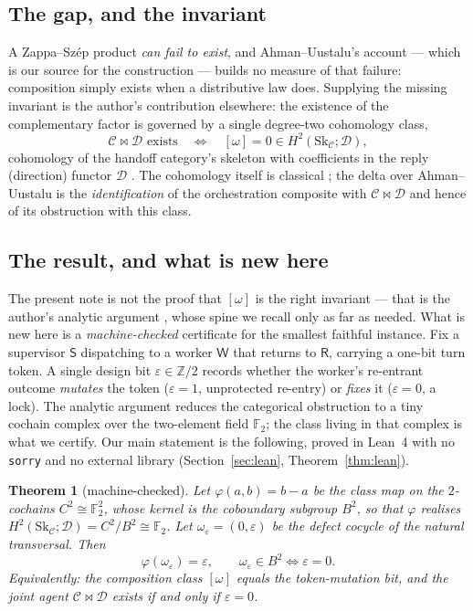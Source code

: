 \documentclass[11pt]{amsart}
\newtheorem{theorem}{Theorem}[section]
\theoremstyle{definition}
\theoremstyle{remark}
\newcommand{\C}{\mathcal{C}}
\newcommand{\D}{\mathcal{D}}
\newcommand{\Sk}{\mathrm{Sk}}
\newcommand{\Sup}{\mathsf{S}}
\newcommand{\Wk}{\mathsf{W}}
\newcommand{\Rt}{\mathsf{R}}
\newcommand{\dir}{\mathcal{D}}
\newcommand{\FF}{\mathbb{F}_2}
\begin{document}
\subsection*{The gap, and the invariant}
A Zappa--Sz\'ep product \emph{can fail to exist}, and Ahman--Uustalu's account --- which is our
source for the construction --- builds no measure of that failure: composition simply exists when a
distributive law does. Supplying the missing invariant is the author's contribution elsewhere: the
existence of the complementary factor is governed by a single degree-two cohomology class,
\[
  \C\bowtie\D \text{ exists}
  \quad\Longleftrightarrow\quad
  [\omega]=0\in H^2(\Sk_\C;\dir),
\]
cohomology of the handoff category's skeleton with coefficients in the reply (direction) functor
$\dir$ \cite{gobstr,pairwise}. The cohomology itself is classical
\cite{baueswirsching,rw,pirashvili}; the delta over Ahman--Uustalu is the \emph{identification} of
the orchestration composite with $\C\bowtie\D$ and hence of its obstruction with this class.

\subsection*{The result, and what is new here}
The present note is not the proof that $[\omega]$ is the right invariant --- that is the author's
analytic argument \cite{analytic}, whose spine we recall only as far as needed. What is new here is a
\emph{machine-checked} certificate for the smallest faithful instance. Fix a supervisor $\Sup$
dispatching to a worker $\Wk$ that returns to $\Rt$, carrying a one-bit turn token. A single design
bit $\varepsilon\in\mathbb Z/2$ records whether the worker's re-entrant outcome \emph{mutates} the
token ($\varepsilon=1$, unprotected re-entry) or \emph{fixes} it ($\varepsilon=0$, a lock). The
analytic argument reduces the categorical obstruction to a tiny cochain complex over the two-element
field $\FF$; the class living in that complex is what we certify. Our main statement is the following,
proved in Lean~4 with no \texttt{sorry} and no external library
(Section~\ref{sec:lean}, Theorem~\ref{thm:lean}).

\begin{theorem}[machine-checked]\label{thm:main-intro}
Let $\varphi(a,b)=b-a$ be the class map on the $2$-cochains $C^2\cong\FF^2$, whose kernel is the
coboundary subgroup $B^2$, so that $\varphi$ realises $H^2(\Sk_\C;\dir)=C^2/B^2\cong\FF$. Let
$\omega_\varepsilon=(0,\varepsilon)$ be the defect cocycle of the natural transversal. Then
\[
  \varphi(\omega_\varepsilon)=\varepsilon,
  \qquad
  \omega_\varepsilon\in B^2 \iff \varepsilon=0 .
\]
Equivalently: the composition class $[\omega]$ equals the token-mutation bit, and the joint agent
$\C\bowtie\D$ exists if and only if $\varepsilon=0$.
\end{theorem}
\end{document}
